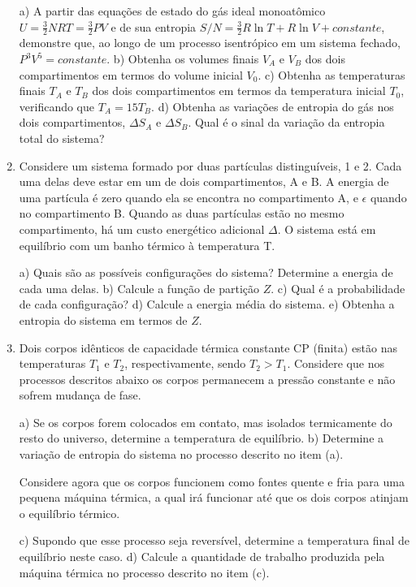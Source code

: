 \begin{enumerate}[start=1,label={\bfseries Q\arabic*.}]
a) A partir das equações de estado do gás ideal monoatômico $U = \frac{3}{2}NRT = \frac{3}{2} PV$ e de sua entropia $S/N = \frac{3}{2} R \operatorname{ln} T + R \operatorname{ln} V + constante$, demonstre que, ao longo de um processo isentrópico em um sistema fechado, $P^{3}V^{5} = constante$.
b) Obtenha os volumes finais $V_{A}$ e $V_{B}$ dos dois compartimentos em termos do volume inicial $V_{0}$.
c) Obtenha as temperaturas finais $T_{A}$ e $T_{B}$ dos dois compartimentos em termos da temperatura inicial $T_{0}$, verificando que $T_{A} = 15 T_{B}$.
d) Obtenha as variações de entropia do gás nos dois compartimentos, $\Delta S_{A}$ e $\Delta S_{B}$. Qual é o sinal da variação da entropia total do sistema?



\item Considere um sistema formado por duas partículas distinguíveis, 1 e 2. Cada uma delas deve estar em um de dois compartimentos, A e B. A energia de uma partícula é zero quando ela se encontra no compartimento A, e $\epsilon$ quando no compartimento B. Quando as duas partículas estão no mesmo compartimento, há um custo energético adicional $\Delta$. O sistema está em equilíbrio com um banho térmico à temperatura T.

a) Quais são as possíveis configurações do sistema? Determine a energia de cada uma delas.
b) Calcule a função de partição $Z$.
c) Qual é a probabilidade de cada configuração?
d) Calcule a energia média do sistema.
e) Obtenha a entropia do sistema em termos de $Z$.




\item Dois corpos idênticos de capacidade térmica constante CP (finita) estão nas temperaturas $T_{1}$ e $T_{2}$, respectivamente, sendo $T_{2} > T_{1}$. Considere que nos processos descritos abaixo os corpos permanecem a pressão constante e não sofrem mudança de fase.

a) Se os corpos forem colocados em contato, mas isolados termicamente do resto do universo, determine a temperatura de equilíbrio.
b) Determine a variação de entropia do sistema no processo descrito no item (a).

Considere agora que os corpos funcionem como fontes quente e fria para uma pequena máquina térmica, a qual irá funcionar até que os dois corpos atinjam o equilíbrio térmico.

c) Supondo que esse processo seja reversível, determine a temperatura final de equilíbrio neste caso.
d) Calcule a quantidade de trabalho produzida pela máquina térmica no processo descrito no item (c).




\end{enumerate}
